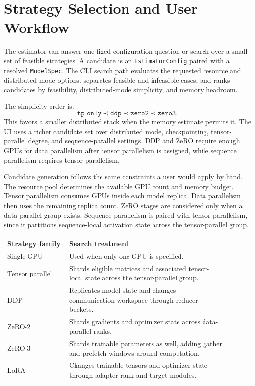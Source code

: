 \section{Strategy Selection and User Workflow}
The estimator can answer one fixed-configuration question or search over a
small set of feasible strategies. A candidate is an \texttt{EstimatorConfig}
paired with a resolved \texttt{ModelSpec}. The CLI search path evaluates the
requested resource and distributed-mode options, separates feasible and
infeasible cases, and ranks candidates by feasibility, distributed-mode
simplicity, and memory headroom.

The simplicity order is:
\[
\texttt{tp\_only}
\prec
\texttt{ddp}
\prec
\texttt{zero2}
\prec
\texttt{zero3}.
\]
This favors a smaller distributed stack when the memory estimate permits it.
The UI uses a richer candidate set over distributed mode,
checkpointing, tensor-parallel degree, and sequence-parallel settings. DDP and
ZeRO require enough GPUs for data parallelism after tensor parallelism is
assigned, while sequence parallelism requires tensor parallelism.

Candidate generation follows the same constraints a user would apply by hand.
The resource pool determines the available GPU count and memory budget. Tensor
parallelism consumes GPUs inside each model replica. Data parallelism then uses
the remaining replica count. ZeRO stages are considered only when a data
parallel group exists. Sequence parallelism is paired with tensor parallelism,
since it partitions sequence-local activation state across the tensor-parallel
group.

\begin{center}
\small
\begin{tabular}{@{}p{0.25\linewidth}p{0.65\linewidth}@{}}
\toprule
Strategy family & Search treatment \\
\midrule
Single GPU & Used when only one GPU is specified. \\
Tensor parallel & Shards eligible matrices and associated tensor-local state
across the tensor-parallel group. \\
DDP & Replicates model state and changes communication workspace through
reducer buckets. \\
ZeRO-2 & Shards gradients and optimizer state across data-parallel ranks. \\
ZeRO-3 & Shards trainable parameters as well, adding gather and prefetch
windows around computation. \\
LoRA & Changes trainable tensors and optimizer state through adapter rank and
target modules. \\
\bottomrule
\end{tabular}
\normalsize
\end{center}

